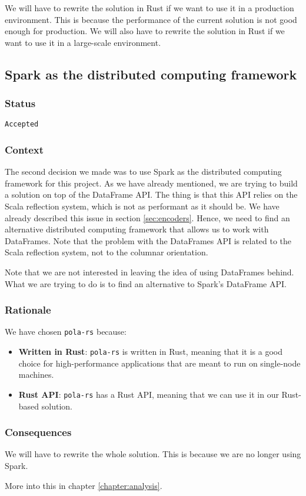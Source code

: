 We will have to rewrite the solution in Rust if we want to use it in a production environment. This is because the performance of the current solution is not good enough for production. We will also have to rewrite the solution in Rust if we want to use it in a large-scale environment.

\subsection{Spark as the distributed computing framework}

\subsubsection{Status}

\texttt{Accepted}

\subsubsection{Context}

The second decision we made was to use Spark as the distributed computing framework for this project. As we have already mentioned, we are trying to build a solution on top of the DataFrame API. The thing is that this API relies on the Scala reflection system, which is not as performant as it should be. We have already described this issue in section \ref{sec:encoders}. Hence, we need to find an alternative distributed computing framework that allows us to work with DataFrames. Note that the problem with the DataFrames API is related to the Scala reflection system, not to the columnar orientation.

Note that we are not interested in leaving the idea of using DataFrames behind. What we are trying to do is to find an alternative to Spark's DataFrame API.

\subsubsection{Rationale}

We have chosen \texttt{pola-rs} because:

\begin{itemize}
    \itemsep0.5em
    \item \textbf{Written in Rust}: \texttt{pola-rs} is written in Rust, meaning that it is a good choice for high-performance applications that are meant to run on single-node machines.
    \item \textbf{Rust API}: \texttt{pola-rs} has a Rust API, meaning that we can use it in our Rust-based solution.
\end{itemize}

\subsubsection{Consequences}

We will have to rewrite the whole solution. This is because we are no longer using Spark.

More into this in chapter \ref{chapter:analysis}.